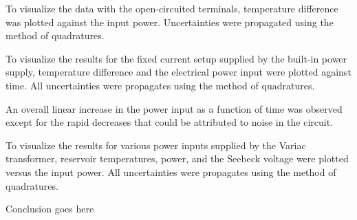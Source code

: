 \begin{paper}
	
	To visualize the data with the open-circuited terminals, temperature difference was plotted against the input power. Uncertainties were propagated using the method of quadratures.
	
	
	To visualize the results for the fixed current setup supplied by the built-in power supply, temperature difference and the electrical power input were plotted against time. All uncertainties were propagates using the method of quadratures.
	
	
	An overall linear increase in the power input as a function of time was observed except for the rapid decreases that could be attributed to noise in the circuit. 
	
	To visualize the results for various power inputs supplied by the Variac transformer, reservoir temperatures, power, and the Seebeck voltage were plotted versus the input power. All uncertainties were propagates using the method of quadratures.
	
	
	
	

	Conclusion goes here
	


\end{paper}
